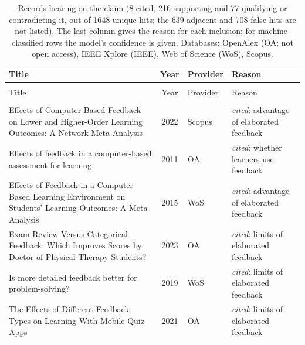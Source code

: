 
\begingroup\footnotesize
\begin{longtable}{@{}%
  >{\raggedright\arraybackslash}p{}c%
  >{\raggedright\arraybackslash}p{}%
  >{\raggedright\arraybackslash}p{}@{}}
\caption{Records bearing on the claim (8 cited, 216 supporting and 77 qualifying or contradicting it, out of 1648 unique hits; the 639 adjacent and 708 false hits are not listed). The last column gives the reason for each inclusion; for machine-classified rows the model's confidence is given. Databases: OpenAlex (OA; not open access), IEEE Xplore (IEEE), Web of Science (WoS), Scopus.}\label{tab:sok-feedback}\\
\toprule
Title & Year & Provider & Reason \\
\midrule
\endfirsthead
\multicolumn{4}{@{}l}{\emph{\tablename~\thetable{} (cont.)}}\\
\toprule
Title & Year & Provider & Reason \\
\midrule
\endhead
\midrule \multicolumn{4}{r@{}}{\emph{continued on next page}}\\
\endfoot
\bottomrule
\endlastfoot
Effects of Computer-Based Feedback on Lower and Higher-Order Learning Outcomes: A Network Meta-Analysis & 2022 & Scopus & \emph{cited}: advantage of elaborated feedback \\
Effects of feedback in a computer-based assessment for learning & 2011 & OA & \emph{cited}: whether learners use feedback \\
Effects of Feedback in a Computer-Based Learning Environment on Students' Learning Outcomes: A Meta-Analysis & 2015 & WoS & \emph{cited}: advantage of elaborated feedback \\
Exam Review Versus Categorical Feedback: Which Improves Scores by Doctor of Physical Therapy Students? & 2023 & OA & \emph{cited}: limits of elaborated feedback \\
Is more detailed feedback better for problem-solving? & 2019 & WoS & \emph{cited}: limits of elaborated feedback \\
The Effects of Different Feedback Types on Learning With Mobile Quiz Apps & 2021 & OA & \emph{cited}: limits of elaborated feedback \\

\end{longtable}
